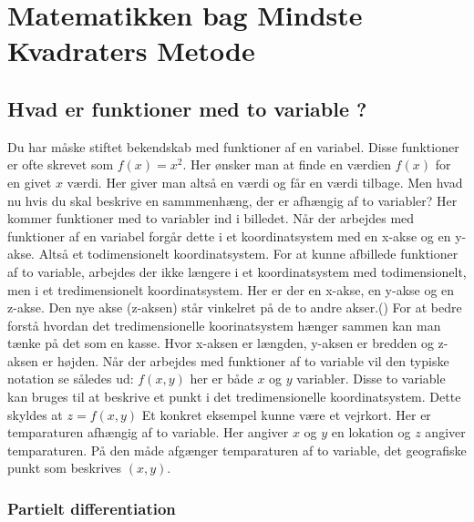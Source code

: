\section{Matematikken bag Mindste Kvadraters Metode}

\subsection{Hvad er funktioner med to variable ?}
Du har måske stiftet bekendskab med funktioner af en variabel. Disse funktioner er ofte skrevet som \begin{math}f(x) = x^2\end{math}. Her ønsker man at finde en værdien $f(x)$ for en givet $x$ værdi. Her giver man altså en værdi og får en værdi tilbage. Men hvad nu hvis du skal beskrive en sammmenhæng, der er afhængig af to variabler? Her kommer funktioner med to variabler ind i billedet. Når der arbejdes med funktioner af en variabel forgår dette i et koordinatsystem med en x-akse og en y-akse. Altså et todimensionelt koordinatsystem. For at kunne afbillede funktioner af to variable, arbejdes der ikke længere i et koordinatsystem med todimensionelt, men i et tredimensionelt koordinatsystem. Her er der en x-akse, en y-akse og en z-akse. Den nye akse (z-aksen) står vinkelret på de to andre akser.(\cite[246-248]{funktionrAfToVariable}) For at bedre forstå hvordan det tredimensionelle  koorinatsystem hænger sammen kan man tænke på det som en kasse. Hvor x-aksen er længden, y-aksen er bredden og z-aksen er højden. Når der arbejdes med funktioner af to variable vil den typiske notation se således ud: $f(x,y)$ her er både $x$ og $y$ variabler. Disse to variable kan bruges til at beskrive et punkt i det tredimensionelle koordinatsystem. Dette skyldes at $z = f(x,y)$ Et konkret eksempel kunne være et vejrkort. Her er temparaturen afhængig af to variable. Her angiver $x$ og $y$ en lokation og $z$ angiver temparaturen. På den måde afgænger temparaturen af to variable, det geografiske punkt som beskrives $(x,y)$.\\


\subsubsection{Partielt differentiation}


